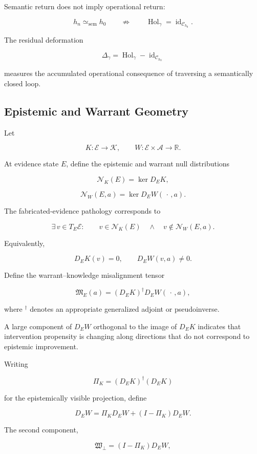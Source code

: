 \documentclass[11pt]{article}
\newcommand{\semEq}{\simeq_{\mathrm{sem}}}
\begin{document}
Semantic return does not imply operational return:

\[
h_n\semEq h_0
\qquad\not\Rightarrow\qquad
\operatorname{Hol}_{\gamma}
=
\operatorname{id}_{\mathcal C_{h_0}}.
\]

The residual deformation

\[
\Delta_\gamma
=
\operatorname{Hol}_{\gamma}
-
\operatorname{id}_{\mathcal C_{h_0}}
\]

measures the accumulated operational consequence of traversing a
semantically closed loop.

\subsection{Epistemic and Warrant Geometry}

Let

\[
K:\mathcal E\rightarrow\mathcal K,
\qquad
W:\mathcal E\times\mathcal A\rightarrow\mathbb R.
\]

At evidence state $E$, define the epistemic and warrant null distributions

\[
\mathcal N_K(E)
=
\ker D_EK,
\]

\[
\mathcal N_W(E,a)
=
\ker D_EW(\,\cdot\,,a).
\]

The fabricated-evidence pathology corresponds to

\[
\exists\,v\in T_E\mathcal E:
\qquad
v\in\mathcal N_K(E)
\quad\land\quad
v\notin\mathcal N_W(E,a).
\]

Equivalently,

\[
D_EK(v)=0,
\qquad
D_EW(v,a)\neq0.
\]

Define the warrant--knowledge misalignment tensor

\[
\mathfrak M_E(a)
=
(D_EK)^{\dagger}D_EW(\,\cdot\,,a),
\]

where ${}^{\dagger}$ denotes an appropriate generalized adjoint or
pseudoinverse.

A large component of $D_EW$ orthogonal to the image of $D_EK$ indicates
that intervention propensity is changing along directions that do not
correspond to epistemic improvement.

Writing

\[
\Pi_K
=
(D_EK)^{\dagger}(D_EK)
\]

for the epistemically visible projection, define

\[
D_EW
=
\Pi_KD_EW
+
(I-\Pi_K)D_EW.
\]

The second component,

\[
\boxed{
\mathfrak W_{\perp}
=
(I-\Pi_K)D_EW,
}
\]
\end{document}
